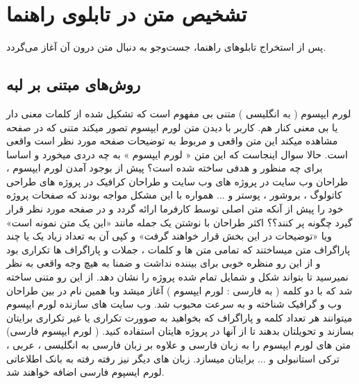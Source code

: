\documentclass[oneside,openany,mscS]{SBU-Thesis}
\begin{document}
\section{تشخیص متن در تابلوی راهنما}
\label{sec:textReview}
پس از استخراج تابلوهای راهنما، جست‌وجو به دنبال متن درون آن آغاز می‌گردد.
\subsection{روش‌های مبتنی بر لبه}

لورم ایپسوم ( به انگلیسی  ) متنی بی مفهوم است که تشکیل شده از کلمات معنی دار یا بی معنی کنار هم. کاربر با دیدن متن لورم ایپسوم تصور میکند متنی که در صفحه مشاهده میکند این متن واقعی و مربوط به توضیحات صفحه مورد نظر است واقعی است. حالا سوال اینجاست که این متن « لورم ایپسوم » به چه دردی میخورد و اساسا برای چه منظور و هدفی ساخته شده است؟ پیش از بوجود آمدن لورم ایپسوم ، طراحان وب سایت در پروژه های وب سایت و طراحان کرافیک در پروژه های طراحی کاتولوگ ، بروشور ، پوستر و ... همواره با این مشکل مواجه بودند که صفحات پروژه خود را پیش از آنکه متن اصلی توسط کارفرما ارائه گردد و در صفحه مورد نظر قرار گیرد چگونه پر کنند؟؟ اکثر طراحان با نوشتن یک جمله مانند «این یک متن نمونه است» ویا «توضیحات در این بخش قرار خواهند گرفت» و کپی آن به تعداد زیاد یک یا چند پاراگراف متن میساختند که تمامی متن ها و کلمات ، جملات و پاراگراف ها تکراری بود و از این رو منظره خوبی برای بیننده نداشت و ضمنا به هیچ وجه واقعی به نظر نمیرسید تا بتواند شکل و شمایل تمام شده پروژه را نشان دهد. از این رو متنی ساخته شد که با دو کلمه ( به فارسی : لورم ایپسوم ) آغاز میشد وبا همین نام در بین طراحان وب و گرافیک شناخته و به سرعت محبوب شد. وب سایت های سازنده لورم ایپسوم میتوانند هر تعداد کلمه و پاراگراف که بخواهید به صوورت تکراری یا غیر تکراری برایتان بسازند و تحویلتان بدهند تا از آنها در پروژه هایتان استفاده کنید. ( لورم ایپسوم فارسی) متن های لورم ایپسوم را به زبان فارسی و علاوه بر زبان فارسی به انگلیسی ، عربی ، ترکی استانبولی و ... برایتان میسازد. زبان های دیگر نیز رفته رفته به بانک اطلاعاتی لورم ایسپوم فارسی اضافه خواهند شد.  
\end{document}
